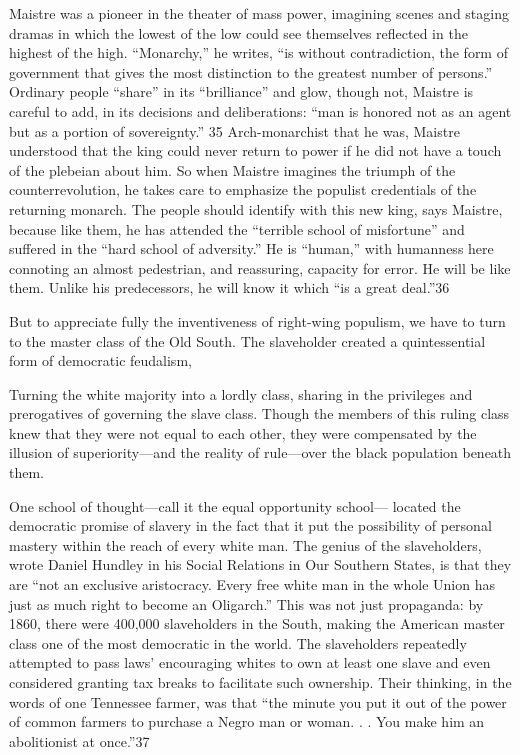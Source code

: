  \par 
Maistre was a pioneer in the theater of mass power, imagining scenes and staging dramas in which the lowest of the low could see themselves reflected in the highest of the high. “Monarchy,” he writes, “is without contradiction, the form of government that gives the most distinction to the greatest number of persons.” Ordinary people “share” in its “brilliance” and glow, though not, Maistre is careful to add, in its decisions and deliberations: “man is honored not as an agent but as a portion of sovereignty.” {\color{blue}35} Arch-monarchist that he was, Maistre understood that the king could never return to power if he did not have a touch of the plebeian about him. So when Maistre imagines the triumph of the counterrevolution, he takes care to emphasize the populist credentials of the returning monarch. The people should identify with this new king, says Maistre, because like them, he has attended the “terrible school of misfortune” and suffered in the “hard school of adversity.” He is “human,” with humanness here connoting an almost pedestrian, and reassuring, capacity for error. He will be like them. Unlike his predecessors, he will know it which “is a great deal.”{\color{blue}36}
 \par 
But to appreciate fully the inventiveness of right-wing populism, we have to turn to the master class of the Old South. The slaveholder created a quintessential form of democratic feudalism,
 \par 
Turning the white majority into a lordly class, sharing in the privileges and prerogatives of governing the slave class. Though the members of this ruling class knew that they were not equal to each other, they were compensated by the illusion of superiority—and the reality of rule—over the black population beneath them.
 \par 
One school of thought—call it the equal opportunity school— located the democratic promise of slavery in the fact that it put the possibility of personal mastery within the reach of every white man. The genius of the slaveholders, wrote Daniel Hundley in his Social Relations in Our Southern States, is that they are “not an exclusive aristocracy. Every free white man in the whole Union has just as much right to become an Oligarch.” This was not just propaganda: by 1860, there were 400,000 slaveholders in the South, making the American master class one of the most democratic in the world. The slaveholders repeatedly attempted to pass laws' encouraging whites to own at least one slave and even considered granting tax breaks to facilitate such ownership. Their thinking, in the words of one Tennessee farmer, was that “the minute you put it out of the power of common farmers to purchase a Negro man or woman. . . You make him an abolitionist at once.”{\color{blue}37}
